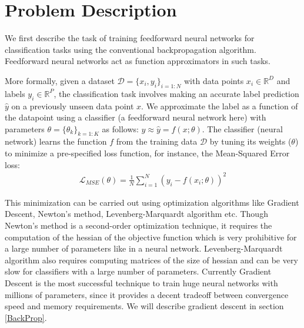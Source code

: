 \section{Problem Description}
\label{ProbDesc}

We first describe the task of training feedforward neural networks for classification tasks using the conventional backpropagation algorithm. Feedforward neural networks act as function approximators in such tasks.

More formally, given a dataset $ \mathcal{D} = \{x_i,y_i\}_{i=1:N}$ with data points $x_i \in \mathbb{R}^D$ and labels $y_i \in \mathbb{R}^P$, the classification task involves making an accurate label prediction $\hat{y}$ on a previously unseen data point $x$. We approximate the label as a function of the datapoint using a classifier (a feedforward neural network here) with parameters $\theta = \{\theta_k\}_{k=1:K}$ as follows: $y \approx \hat{y} = f(x; \theta)$.
The classifier (neural network) learns the function $f$ from the training data $\mathcal{D}$ by tuning its weights ($\theta$) to minimize a pre-specified loss function, for instance, the Mean-Squared Error loss:
\begin{align}
\mathcal{L}_{MSE} (\theta) = \frac{1}{N}\sum_{i=1}^N ( y_i - f(x_i; \theta))^2
\end{align}

This minimization can be carried out using optimization algorithms like Gradient Descent, Newton's method, Levenberg-Marquardt algorithm etc.
Though Newton's method is a second-order optimization technique, it requires the computation of the hessian of the objective function which is very prohibitive for a large number of parameters like in a neural network.
Levenberg-Marquardt algorithm also requires computing matrices of the size of hessian and can be very slow for classifiers with a large number of parameters.
Currently Gradient Descent is the most successful technique to train huge neural networks with millions of parameters, since it provides a decent tradeoff between convergence speed and memory requirements. We will describe gradient descent in section \ref{BackProp}.


